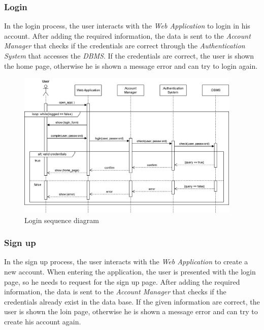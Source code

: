 \documentclass[11pt,twoside]{article}
\begin{document}
\newpage

		\subsubsection{Login}
In the login process, the user interacts with the \textit{Web Application} to login in his account. After adding the required information, the data is sent to the \textit{Account Manager} that checks if the credentials are correct through the \textit{Authentication System} that accesses the \textit{DBMS}. If the credentials are correct, the user is shown the home page, otherwise he is shown a message error and can try to login again.

\begin{figure}[H]
\centering
\includegraphics[width=0.95\textwidth]{Images/Seq1}
\caption{Login sequence diagram}\label{Seq1}
\end{figure}

\newpage

		\subsubsection{Sign up}
In the sign up process, the user interacts with the \textit{Web Application} to create a new account. When entering the application, the user is presented with the login page, so he needs to request for the sign up page. After adding the required information, the data is sent to the \textit{Account Manager} that checks if the credentials already exist in the data base. If the given information are correct, the user is shown the loin page, otherwise he is shown a message error and can try to create his account again.	
		
\end{document}
